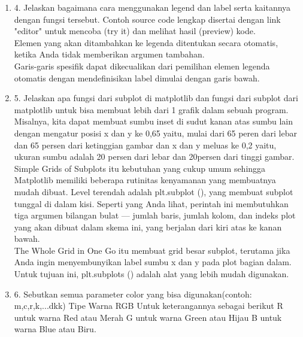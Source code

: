 \documentclass[10pt]{article}
\begin{document}
\begin{enumerate}
\item 4. Jelaskan bagaimana cara menggunakan legend dan label serta kaitannya dengan fungsi tersebut.
Contoh source code lengkap disertai dengan link "editor" untuk mencoba (try it) dan melihat hasil (preview) kode.\\

Elemen yang akan ditambahkan ke legenda ditentukan secara otomatis, ketika Anda tidak memberikan argumen tambahan.\\

Garis-garis spesifik dapat dikecualikan dari pemilihan elemen legenda otomatis dengan mendefinisikan label dimulai dengan garis bawah.\\

\item 5. Jelaskan apa fungsi dari subplot di matplotlib dan fungsi dari subplot dari matplotlib untuk bisa membuat lebih dari 1 grafik dalam sebuah program.\\

Misalnya, kita dapat membuat sumbu inset di sudut kanan atas sumbu lain dengan mengatur posisi x dan y ke 0,65 yaitu, mulai dari 65 peren dari lebar dan 65 persen  dari ketinggian gambar dan x dan y meluas ke 0,2 yaitu, ukuran sumbu adalah 20 persen  dari lebar dan 20persen dari tinggi gambar.\\

Simple Grids of Subplots itu kebutuhan yang cukup umum sehingga Matplotlib memiliki beberapa rutinitas kenyamanan yang membuatnya mudah dibuat. Level terendah adalah plt.subplot (), yang membuat subplot tunggal di dalam kisi. Seperti yang Anda lihat, perintah ini membutuhkan tiga argumen bilangan bulat — jumlah baris, jumlah kolom, dan indeks plot yang akan dibuat dalam skema ini, yang berjalan dari kiri atas ke kanan bawah.\\

The Whole Grid in One Go itu  membuat grid besar subplot, terutama jika Anda ingin menyembunyikan label sumbu x dan y pada plot bagian dalam. Untuk tujuan ini, plt.subplots () adalah alat yang lebih mudah digunakan.\\

 
\item 6. Sebutkan semua parameter color yang bisa digunakan(contoh: m,c,r,k,...dkk)
Tipe Warna RGB
    Untuk keterangannya sebagai berikut
    R untuk warna Red atau Merah
    G untuk warna Green atau Hijau
    B untuk warna Blue atau Biru.\\
    

\end{enumerate}
\end{document}
